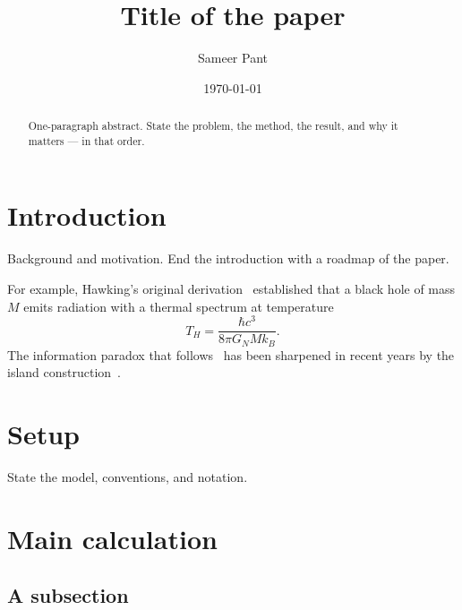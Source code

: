 \documentclass[
  aps,           %
  prd,           %
  reprint,       %
  superscriptaddress,
  nofootinbib,
  amsmath,
  amssymb,
  floatfix,
]{revtex4-2}
\newcommand{\GN}{G_{\!N}}                     %
\begin{document}
\title{Title of the paper}

\author{Sameer Pant}

\date{\today}

\begin{abstract}
One-paragraph abstract. State the problem, the method, the result, and why it
matters --- in that order.
\end{abstract}

\maketitle

\section{Introduction}
\label{sec:intro}

Background and motivation. End the introduction with a roadmap of the paper.

For example, Hawking's original derivation~\cite{Hawking1975} established that
a black hole of mass $M$ emits radiation with a thermal spectrum at temperature
\begin{equation}
  T_H = \frac{\hbar c^3}{8\pi \GN M k_B}.
  \label{eq:hawking-temp}
\end{equation}
The information paradox that follows~\cite{Page1993b, AMPS2013} has been
sharpened in recent years by the island
construction~\cite{Penington2019, AEMM2019, PenningtonShenkerStanfordYang2019}.

\section{Setup}
\label{sec:setup}

State the model, conventions, and notation.

\section{Main calculation}
\label{sec:main}

\subsection{A subsection}
\end{document}
